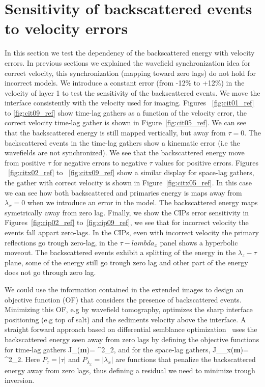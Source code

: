 \section{Sensitivity of backscattered events to velocity errors}
In this section we test the dependency of the backscattered energy with velocity errors. In previous sections we explained the wavefield 
synchronization idea for correct velocity, this synchronization (mapping toward zero lags) do not hold for incorrect models. 
We introduce a constant error (from -12\% to +12\%) in the velocity of layer 1 to test the sensitivity of the backscattered events.
We move the interface consistently with the velocity used for imaging.
Figures ~\ref{fig:cit01_ref} to \ref{fig:cit09_ref} show time-lag gathers as a function of the velocity error, 
the correct velocity time-lag gather is shown in Figure~\ref{fig:cit05_ref}. We can see that the backscattered energy is still mapped vertically, but
away from $\tau=0$. The backscattered events in the time-lag gathers show a kinematic error (i.e the wavefields are not synchronized). We 
see that the backscattered energy move from positive $\tau$ for negative errors to negative $\tau$ values for positive errors. 
%
Figures ~\ref{fig:citx02_ref} to ~\ref{fig:citx09_ref} show a similar display for space-lag gathers, the gather with correct velocity is shown
in Figure~\ref{fig:citx05_ref}. 
In this case we can see how both backscattered and primaries energy is maps away from $\lambda_x=0$ when we introduce an error in the model. The backscattered energy maps symetrically
away from zero lag. Finally, we show the CIPs error sensitivity in Figures~\ref{fig:cip02_ref} to~\ref{fig:cip09_ref}, we see that for incorrect velocity the events
fall appart zero-lags. In the CIPs, even with incorrect velocity the primary reflections go trough zero-lag, in the $\tau-lambda_x$ panel shows a hyperbolic
moveout. The backscattered events exhibit a splitting of the energy in the $\lambda_z-\tau$ plane, some of the energy still go trough zero lag and other part
of the energy does not go through zero lag.

We could use the information contained in the extended images to design an objective function (OF) that considers the presence of backscattered events. 
Minimizing this OF, e.g by wavefield tomography, optimizes the sharp interface positioning (e.g top of salt) and the sediments velocity above the interface.
A straight forward approach based on differential semblance optimization~\citep{shen:2132} uses
 the backscattered energy seen away from zero lags by defining the objective functions for time-lag gathers
\beq
 J_{\tau}({\bf m})=  ^2_2,
\label{eq:of1}
\eeq 
and for the space-lag gathers,
\beq
 J_{\lambda_x}({\bf m})=  ^2_2.
\label{eq:of2}
\eeq 
%
Here $P_{\tau}=|\tau|$ and $P_{\lambda_x}=|\lambda_x|$ are functions that penalize the backscattered energy away 
from zero lags, thus defining a residual we need to minimize trough inversion.

